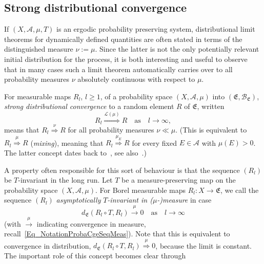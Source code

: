 \documentclass[AHL,Unicode,longabstracts]{cedram}
\newcommand{\clA}{\mathcal{A}}
\newcommand{\clB}{\mathcal{B}}
\newcommand{\clL}{\mathcal{L}}
\newcommand{\frkE}{\mathfrak{E}}
\begin{document}
\subsection{Strong distributional convergence}
If $(X,\clA,\mu,T)$ is an ergodic probability preserving system, distributional limit theorems for dynamically defined quantities are often stated in terms of the distinguished measure $\nu:=\mu$. Since the latter is not the only potentially relevant initial distribution for the process, it is both interesting and useful to observe that in many cases such a limit theorem automatically carries over to all probability measures $\nu$ absolutely continuous with respect to $\mu$.

For measurable maps $R_{l}$, $l\geq1$, of a probability space $(X,\clA,\mu)$ into $(\frkE,\clB_{\frkE})$, \emph{strong distributional convergence} to a random element $R$ of $\frkE$, written
\begin{equation}
R_{l}\overset{\clL(\mu)}{\Longrightarrow}R \quad \text{as}\quad l\rightarrow\infty,
\end{equation}
means that $R_{l}\overset{\nu}{\Longrightarrow}R$ for all probability measures $\nu\ll\mu$. (This is equivalent to $R_{l}\overset{\mu}{\Longrightarrow}R$ (\emph{mixing}), meaning that $R_{l}\overset{\mu_{E}}{\Longrightarrow}R$ for every fixed $E\in\clA$ with $\mu(E)>0$. The latter concept dates back to~\cite{Renyi}, see also~\cite{Ea}.)


A property often responsible for this sort of behaviour is that the sequence $(R_{l})$ be $T$-invariant in the long run. Let $T$ be a measure-preserving map on the probability space $(X,\clA,\mu)$. For Borel measurable maps $R_{l}:X\rightarrow\frkE$, we call the sequence $(R_{l})$
\emph{asymptotically }$T$\emph{-invariant in (}$\mu$\emph{-)measure} in case
\begin{equation}\label{Eq_AsyTInvar}
d_{\frkE}\left(R_{l}\circ T,R_{l}\right)\overset{\mu}{\longrightarrow}0\quad\text{as}\quad l\rightarrow\infty
\end{equation}
(with $\overset{\mu}{\longrightarrow}$ indicating convergence in measure, recall~\eqref{Eq_NotationProbaCgeSeqMeas}). Note that this is equivalent to convergence in distribution, $d_{\frkE}(R_{l}\circ T,R_{l})\overset {\mu}{\Longrightarrow}0$, because the limit is constant. The important role of this concept becomes clear through
\end{document}
